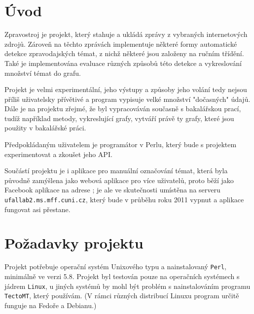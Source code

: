 \documentclass[12pt,a4paper]{report}
\begin{document}
    

\tableofcontents


\chapter{Úvod}
Zpravostroj je projekt, který stahuje a ukládá zprávy z vybraných internetových zdrojů. Zároveň na těchto zprávách implementuje některé formy automatické detekce zpravodajských témat, z nichž některé jsou založeny na ručním třídění. Také je implementována evaluace různých způsobů této detekce a vykreslování množství témat do grafu.

Projekt je velmi experimentální, jeho výstupy a způsoby jeho volání tedy nejsou příliš uživatelsky přívětivé a program vypisuje velké množství "dočasných" údajů. Dále je na projektu zřejmé, že byl vypracováván současně s bakalářskou prací, tudíž například metody, vykreslující grafy, vytváří právě ty grafy, které jsou použity v bakalářské práci.

Předpokládaným uživatelem je programátor v Perlu, který bude s projektem experimentovat a zkoušet jeho API.


Součástí projektu je i aplikace pro manuální označování témat, která byla původně zamýšlena jako webová aplikace pro více uživatelů, proto běží jako Facebook aplikace na adrese ; je ale ve skutečnosti umístěna na serveru \texttt{ufallab2.ms.mff.cuni.cz}, který bude v průběhu roku 2011 vypnut a aplikace fungovat asi přestane.

\chapter{Požadavky projektu}

Projekt potřebuje operační systém Unixového typu a nainstalovaný \texttt{Perl}, minimálně ve verzi 5.8. Projekt byl testován pouze na operačních systémech s jádrem \texttt{Linux}, u jiných systémů by mohl být problém s nainstalováním programu \texttt{TectoMT}, který používám. (V rámci různých distribucí Linuxu program určitě funguje na Fedoře a Debianu.)
\end{document}
